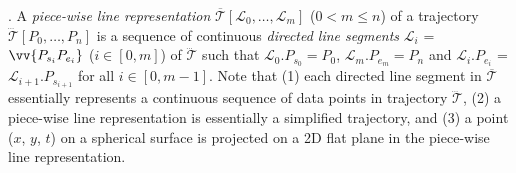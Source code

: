 
. A \textit{piece-wise line representation} $\overline{\mathcal{T}}\left[\mathcal{L}_0, \ldots, \mathcal{L}_m\right]$ ($0< m \le n$) of a trajectory $\dddot{\mathcal{T}}\left[P_0, \ldots, P_n\right]$ is a sequence of continuous \textit{directed line segments} $\mathcal{L}_{i}$ = $\vv{P_{s_i}P_{e_i}}$ ($i\in\left[0,m\right]$) of $\dddot{\mathcal{T}}$ such that $\mathcal{L}_{0}.P_{s_0} = P_0$, $\mathcal{L}_{m}.P_{e_m} = P_n$ and  $\mathcal{L}_{i}.P_{e_i}$ = $\mathcal{L}_{i+1}.P_{s_{i+1}}$ for all $i\in\left[0, m-1\right]$.
Note that (1) each directed line segment in $\overline{\mathcal{T}}$ essentially represents a continuous sequence of data points in trajectory $\dddot{\mathcal{T}}$, (2) a piece-wise line representation is essentially a simplified trajectory, {and (3) a point ($x$, $y$, $t$) on a spherical surface is  projected on a 2D flat plane in the piece-wise line representation.}


